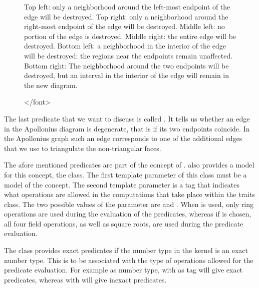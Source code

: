 {\begin{figure}[!t]
{%
  Top left: only a neighborhood around
  the left-most endpoint of the edge will be destroyed. Top right:
  only a neighborhood around the right-most endpoint of the edge will
  be destroyed. Middle left: no portion of the edge is destroyed.
  Middle right: the entire edge will be destroyed. Bottom left: a
  neighborhood in the interior of the edge
  will be destroyed; the regions near the endpoints remain
  unaffected. Bottom right: The neighborhood around the two endpoints
  will be destroyed, but an interval in the interior of the edge will
  remain in the new diagram.}\label{fig-ag2edgeconflict}
\begin{ccHtmlOnly}
</font>
\end{ccHtmlOnly}
\end{figure}

The last predicate that we want to discuss is called
. It tells us whether an edge in the
Apollonius diagram is degenerate, that is if its two endpoints
coincide. In the Apollonius graph such an edge corresponds to one of
the additional edges that we use to triangulate the non-triangular
faces.

The afore mentioned predicates are part of the
 concept of \cgal. \cgal{} also provides
a model for this concept, the
 class. The first
template parameter of this class must be a model of the 
concept. The second template parameter is a tag that indicates what
operations are allowed in the computations that take place within the
traits class.
The two possible values of the  parameter are
 and . When
 is used, only ring operations are used during the
evaluation of the predicates, whereas if  is
chosen, all four field operations, as well as square roots, are used
during the predicate evaluation.

The  class provides exact
predicates if the number type in the kernel  is an exact number
type. This is to be associated with the type of operations allowed for
the predicate evaluation. For example  as number
type, with  as tag will give exact predicates,
whereas  with  will give
inexact predicates.

}
